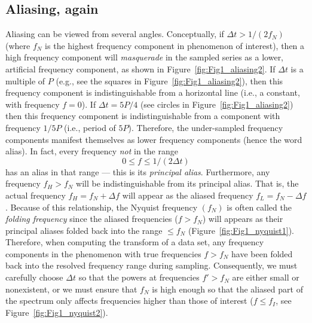 \subsection{Aliasing, again}
Aliasing can be viewed from several angles.  Conceptually, if $\Delta t > 1/(2 f_N)$ (where $f_N$ is 
the highest frequency component in phenomenon of interest), then a high frequency component will \emph{masquerade} in the 
sampled series as a lower, artificial frequency component, as shown in Figure~\ref{fig:Fig1_aliasing2}.
\noindent
If $\Delta t$ is a multiple of $P$ (e.g., see the squares in Figure~\ref{fig:Fig1_aliasing2}), then this frequency component is indistinguishable from a 
horizontal line (i.e., a constant, with frequency $f = 0$).  If  $\Delta t = 5 P/4$ (see circles in Figure~\ref{fig:Fig1_aliasing2}) then this frequency 
component is indistinguishable from a component with frequency $1/5 P$ (i.e., period of $5P$).  Therefore, the 
under-sampled frequency components manifest themselves as lower frequency components 
(hence the word alias).  In fact, every frequency \emph{not} in the range
\begin{equation}
0 \leq f \leq 1/(2\Delta t)
\end{equation}
has an alias in that range --- this is its \emph{principal alias}.  Furthermore, any frequency $f_H > f_N$ 
will be indistinguishable from its principal alias.  That is, the actual frequency $f_H = f_N + \Delta f$ will appear as the aliased frequency $f_L = f_N - \Delta f$.
	Because of this relationship, the Nyquist frequency $(f_N)$ is often called the \emph{folding frequency} since the
aliased frequencies ($f > f_N$) will appears as their principal aliases folded back into the range $\leq f_N$ (Figure~\ref{fig:Fig1_nyquist1}).
Therefore, when computing the transform of a data set,
any frequency components in the phenomenon with true frequencies $f > f_N$ have been folded back into 
the resolved frequency range during sampling.  Consequently, we must carefully choose $\Delta t$ so that the powers at frequencies $f' > f_N$ are either small 
or nonexistent, or we must ensure that $f_N$ is high enough so that the aliased part of the spectrum only affects 
frequencies higher than those of interest ($f \leq f_I$, see Figure~\ref{fig:Fig1_nyquist2}).

